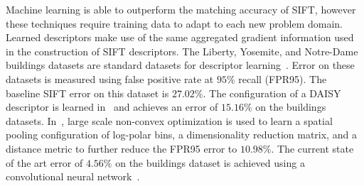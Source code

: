         Machine learning is able to outperform the matching accuracy of
          SIFT, however these techniques require training data to adapt
          to each new problem domain.
        Learned descriptors make use of the same aggregated gradient
          information used in the construction of SIFT descriptors.
        The Liberty, Yosemite, and Notre-Dame buildings datasets are
          standard datasets for descriptor
          learning~\cite{brown_discriminative_2011}.
        Error on these datasets is measured using false positive rate
          at $95\percent$ recall (FPR95).
        The baseline SIFT error on this dataset is $27.02\percent$.
        The configuration of a DAISY descriptor is learned
          in~\cite{winder_picking_2009} and achieves an error of
          $15.16\percent$ on the buildings datasets.
        In~\cite{simonyan_learning_2014}, large scale non-convex
          optimization is used to learn a spatial pooling configuration
          of log-polar bins, a dimensionality reduction matrix, and a
          distance metric to further reduce the FPR95 error to
          $10.98\percent$.
        The current state of the art error of $4.56\percent$ on the
          buildings dataset is achieved using a convolutional neural
          network~\cite{zagoruyko_learning_2015}.


